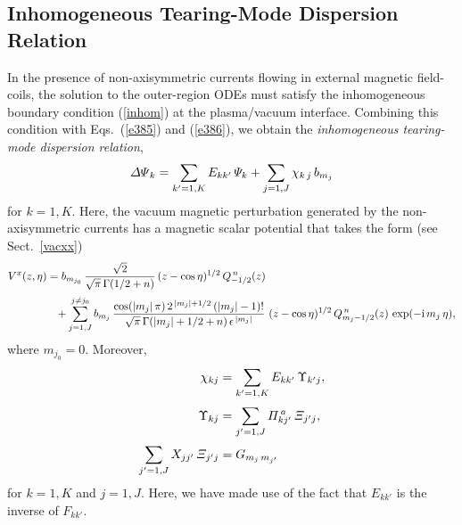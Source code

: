 \documentclass[12pt,prb,aps]{revtex4-1}
\begin{document}
\subsection{Inhomogeneous Tearing-Mode Dispersion Relation}
In the presence of non-axisymmetric currents flowing in external magnetic field-coils, the solution to the outer-region ODEs
must satisfy the inhomogeneous boundary condition (\ref{inhom}) at the plasma/vacuum interface. Combining this
condition with Eqs.~(\ref{e385}) and (\ref{e386}), we obtain the {\em inhomogeneous tearing-mode dispersion relation},
\begin{equation}\label{e408}
{\mit\Delta\Psi}_k=\sum_{k'=1,K}E_{kk'}\,{\mit\Psi}_k+\sum_{j=1,J}\chi_{k\,j}\,b_{m_j}
\end{equation}
for $k=1,K$. 
Here, the  vacuum magnetic perturbation  generated by the non-axisymmetric currents has a magnetic scalar potential  that takes the form (see Sect.~\ref{vacxx})
\begin{align}
V^x(z,\eta)&= b_{m_{j_0}}\,\frac{\sqrt{2}}{\sqrt{\pi}\,\Gamma(1/2+n)}\,(z-\cos\eta)^{1/2}\,Q_{-1/2}^{\,n}(z)\\[0.5ex]
&\phantom{=}+ \sum_{j=1,J}^{j\neq j_0} b_{m_j}\,\frac{\cos(|m_j|\,\pi)\,2^{\,|m_j|+1/2}\,(|m_j|-1)!}{\sqrt{\pi}\,\Gamma(|m_j|+1/2+n)\,\epsilon^{\,|m_j|}}\
(z-\cos\eta)^{1/2}\,Q_{m_j-1/2}^{\,n}(z)\,\exp(-{\rm i}\,m_j\,\eta),\nonumber
\end{align}
where $m_{j_0}=0$. Moreover,
\begin{align}
\chi_{kj} &= \sum_{k'=1,K}E_{kk'}\,\Upsilon_{k'j},\\[0.5ex]
\Upsilon_{kj}&= \sum_{j'=1,J}{\mit\Pi}_{kj'}^{\,a}\,{\mit\Xi}_{j'j},\\[0.5ex]
\sum_{j'=1,J} X_{jj'}\,{\mit\Xi}_{j'j}&= G_{m_j\,m_{j'}}
\end{align}
for $k=1,K$ and $j=1,J$. Here, we have made use of the fact that $E_{kk'}$ is the inverse of $F_{kk'}$.
\end{document}
